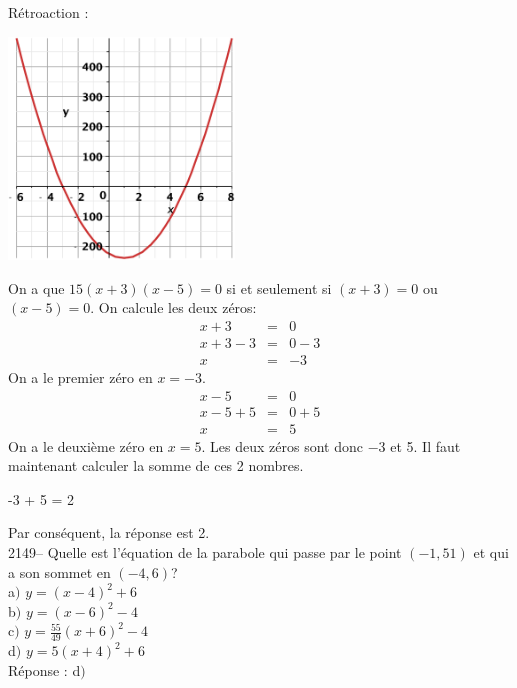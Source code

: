 \documentclass[letterpaper, 12pt]{article}
\begin{document}
R\'etroaction :\\
\begin{center}
 \includegraphics[width=6cm,bb=20 118 575 673]{Q2148.eps}
\end{center}
On a que $ 15(x+3)(x-5) = 0$ si et seulement si $(x+3)=0$ ou $(x-5)=0$. On calcule les deux z\'eros:
\begin{eqnarray*}
 x+3&=&0\\
 x+3-3&=&0-3\\
 x&=&-3
\end{eqnarray*}
On a le premier z\'ero en $x=-3$.
\begin{eqnarray*}
 x-5&=&0\\
 x-5+5&=&0+5\\
 x&=&5
\end{eqnarray*}
On a le deuxi\`eme z\'ero en $x=5$. Les deux z\'eros sont donc $-3$ et 5. Il faut maintenant calculer la somme de ces 2 nombres.
\begin{center}
 -3 + 5 = 2
\end{center}
Par cons\'equent, la r\'eponse est 2.\\

2149-- Quelle est l'\'equation de la parabole qui passe par le point $(-1, 51)$ et qui a son sommet en \mbox{$(-4, 6)$}? \\

a$)$ $y=(x-4)^{2}+6$\\[2mm]
b$)$ $y=(x-6)^{2}-4$\\[2mm]
c$)$ $y=\frac{55}{49}(x+6)^{2}-4$\\[2mm]
d$)$ $y=5(x+4)^{2}+6$\\

R\'eponse : d$)$\\
\end{document}
